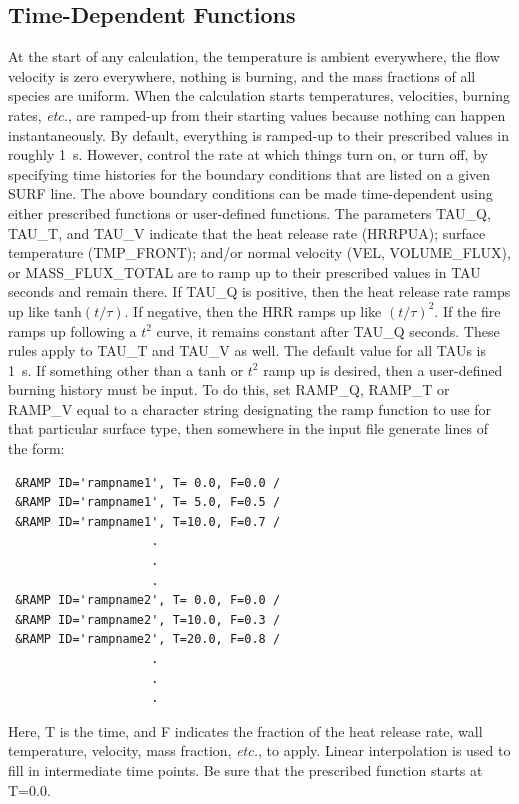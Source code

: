 \documentclass[11pt]{book}
\begin{document}
\subsection{Time-Dependent Functions}

At the start of any calculation, the temperature is
ambient everywhere, the flow velocity is zero everywhere, nothing is burning, and
the mass fractions of all species are uniform.
When the calculation starts temperatures, velocities, burning rates,
{\em etc.}, are ramped-up from their starting values because nothing
can happen instantaneously. By default, everything is ramped-up to their
prescribed values in roughly 1~s. However, control the
rate at which things turn on, or turn off, by specifying time histories
for the boundary conditions that are listed on a given {\ct SURF} line.
The above boundary conditions can be made time-dependent using either
prescribed functions or user-defined functions.
The parameters {\ct TAU\_Q}, {\ct TAU\_T}, and {\ct TAU\_V}
indicate that the heat release rate ({\ct HRRPUA}); surface temperature ({\ct TMP\_FRONT});
and/or normal velocity ({\ct VEL}, {\ct VOLUME\_FLUX}), or {\ct MASS\_FLUX\_TOTAL} are to ramp up
to their prescribed values in {\ct TAU} seconds and remain there.
If {\ct TAU\_Q} is positive, then the heat release rate ramps up
like tanh$(t/\tau)$. If negative, then
the HRR ramps up like $(t/\tau)^2$. If the fire ramps up following
a $t^2$ curve, it remains constant after {\ct TAU\_Q} seconds.
These rules apply to {\ct TAU\_T} and {\ct TAU\_V} as well.
The default value for all {\ct TAU}s is 1~s.
If something other than a tanh or $t^2$ ramp up is desired,
then a user-defined burning history must be input. To do this, set
{\ct RAMP\_Q}, {\ct RAMP\_T} or {\ct RAMP\_V}
equal to a character string designating the ramp function to use for that
particular surface type, then somewhere in the input file generate lines
of the form:

\footnotesize
\begin{verbatim}
 &RAMP ID='rampname1', T= 0.0, F=0.0 /
 &RAMP ID='rampname1', T= 5.0, F=0.5 /
 &RAMP ID='rampname1', T=10.0, F=0.7 /
                    .
                    .
                    .
 &RAMP ID='rampname2', T= 0.0, F=0.0 /
 &RAMP ID='rampname2', T=10.0, F=0.3 /
 &RAMP ID='rampname2', T=20.0, F=0.8 /
                    .
                    .
                    .
\end{verbatim}
\normalsize

\noindent

Here, {\ct T} is the time, and {\ct F} indicates the fraction of the heat
release rate, wall temperature, velocity, mass fraction, {\em etc.}, to apply.
Linear interpolation is used to fill in intermediate time points.
Be sure that the prescribed function starts at {\ct T=0.0}.
\end{document}
